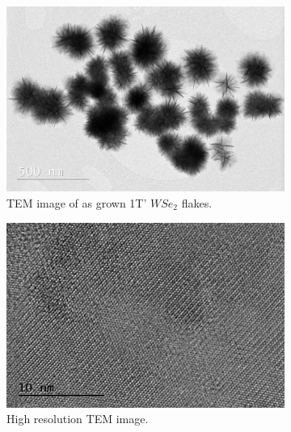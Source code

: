 \begin{figure}[H]
	\begin{center}
		\begin{subfigure}[b]{0.4\textwidth}
			\includegraphics[width=\textwidth]{1T'/TEMImage.png}
			\caption{TEM image of as grown 1T' $WSe_2$ flakes.}
			\label{fig:1T'TEMImage}
		\end{subfigure}
		\qquad
		\begin{subfigure}[b]{0.4\textwidth}
			\includegraphics[width=\textwidth]{1T'/TEMImageHigh.png}
			\caption{High resolution TEM image.}
			\label{fig:1T'TEMImageHigh}
		\end{subfigure}
		\begin{subfigure}[b]{0.4\textwidth}

\end{subfigure}
\end{center}
\end{figure}
